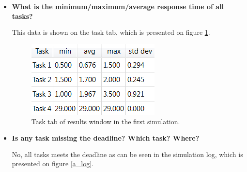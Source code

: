 \documentclass[12pt]{article}
\begin{document}
\begin{itemize}
\item \textbf{What is the minimum/maximum/average response time of all tasks?}

This data is shown on the task tab, which is presented on figure \ref{a_tasks_response_time}.

\begin{figure}[h]
\centering
\includegraphics[scale=1]{figures/a_tasks_response_time}   
\caption{Task tab of results window in the first simulation.}
\label{a_tasks_response_time}
\end{figure}
\FloatBarrier

\item \textbf{Is any task missing the deadline? Which task? Where?}

No, all tasks meets the deadline as can be seen in the simulation log, which is presented on figure \ref{a_log}.


\end{itemize}
\end{document}

